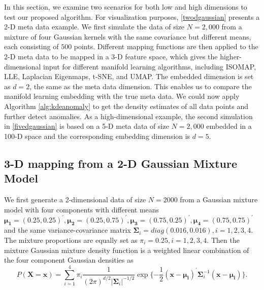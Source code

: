 \documentclass[11pt,a4paper,]{article}
\begin{document}
In this section, we examine two scenarios for both low and high dimensions to test our proposed algorithm. For visualization purposes, \autoref{twodgaussian} presents a 2-D meta data example. We first simulate the data of size \(N=2,000\) from a mixture of four Gaussian kernels with the same covariance but different means, each consisting of \(500\) points. Different mapping functions are then applied to the 2-D meta data to be mapped in a 3-D feature space, which gives the higher-dimensional input for different manifold learning algorithms, including ISOMAP, LLE, Laplacian Eigenmaps, t-SNE, and UMAP. The embedded dimension is set as \(d=2\), the same as the meta data dimension.
This enables us to compare the manifold learning embedding with the true meta data. We could now apply Algorithm \ref{alg:kdeanomaly} to get the density estimates of all data points and further detect anomalies. As a high-dimensional example, the second simulation in \autoref{fivedgaussian} is based on a 5-D meta data of size \(N=2,000\) embedded in a 100-D space and the corresponding embedding dimension is \(d=5\).

\hypertarget{twodgaussian}{%
\subsection{3-D mapping from a 2-D Gaussian Mixture Model}\label{twodgaussian}}

We first generate a 2-dimensional data of size \(N=2000\) from a Gaussian mixture model with four components with different means
\(\pmb{\mu_1}=(0.25, 0.25)^\prime, \pmb{\mu_2}=(0.25, 0.75)^\prime, \pmb{\mu_3}=(0.75, 0.25)^\prime, \pmb{\mu_4}=(0.75, 0.75)^\prime\) and the same variance-covariance matrix \(\pmb{\Sigma}_i=diag(0.016, 0.016), i=1,2,3,4\). The mixture proportions
are equally set as \(\pi_i=0.25, i=1,2,3,4\).
Then the mixture Gaussian mixture density function is a weighted linear combination of the four component Gaussian densities as
\begin{equation}
\label{eq:gmm}
P(\pmb{X}=\pmb{x}) = \sum_{i=1}^{4}\pi_i \frac{1}{(2\pi)^{d/2}|\pmb{\Sigma}_i|^{-1/2}} \exp{\{-\frac{1}{2} (\pmb{x}-\pmb{\mu_i})^\prime \pmb{\Sigma}_i^{-1} (\pmb{x}-\pmb{\mu_i}) \}}.
\end{equation}
\end{document}
